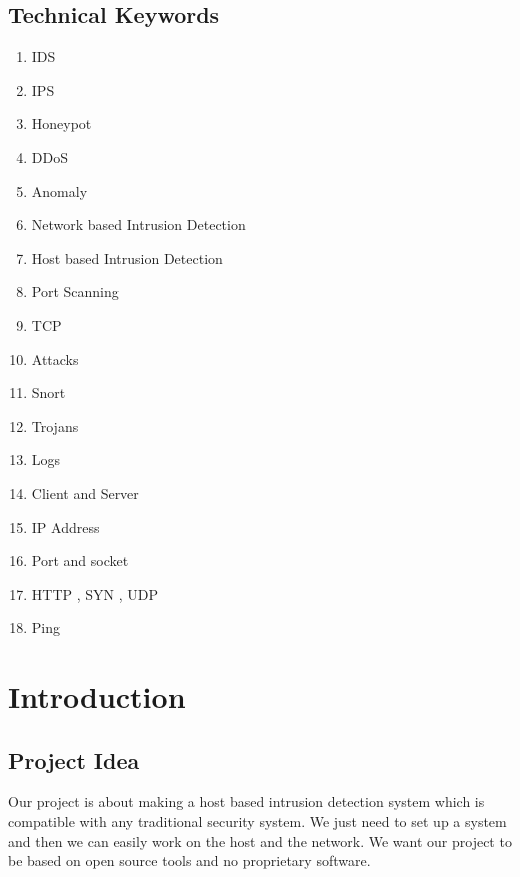 \documentclass[12pt,a4paper]{report}
\begin{document}
\section{Technical Keywords}
\begin{enumerate}
\item	IDS\\
\item	IPS\\
\item	Honeypot\\
\item	DDoS\\
\item	Anomaly\\
\item	Network based Intrusion Detection\\
\item	Host based Intrusion Detection\\
\item	Port Scanning \\
\item	TCP\\
\item	Attacks\\
\item	Snort\\
\item	Trojans\\
\item	Logs\\
\item	Client and Server\\
\item	IP Address\\
\item	Port and socket\\
\item	HTTP , SYN , UDP\\
\item	Ping\\

\end{enumerate}

\newpage
\chapter{Introduction}
\newpage
\section{Project Idea}
Our project is about making a host based intrusion detection system which is compatible with any traditional security system. We just need to set up a system and then we can easily work on the host and the network. We want our project to be based on open source tools and no proprietary software.
\end{document}
